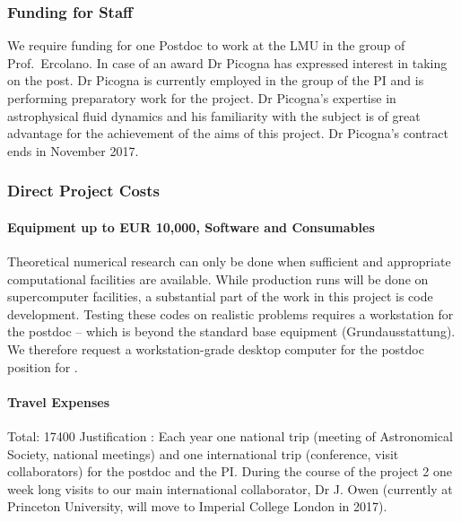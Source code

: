 \documentclass[10pt,fleqn,twoside]{article}
\begin{document}
\subsubsection{Funding for Staff}

We require funding for one Postdoc to work at the LMU in the group of
Prof.\ Ercolano. In case of an award Dr Picogna has expressed interest
in taking on the post. Dr Picogna is currently employed in the group of the
PI and is performing preparatory work for the project. Dr Picogna's
expertise in astrophysical fluid dynamics and his familiarity with the
subject is of great advantage for the achievement of the aims of this
project. Dr Picogna's contract ends in November 2017.

\subsubsection{Direct Project Costs}


\paragraph{Equipment up to EUR 10,000, Software and Consumables}

Theoretical numerical research can only be done when sufficient and
appropriate computational facilities are available. While production
runs will be done on supercomputer facilities, a substantial part of
the work in this project is code development. Testing these codes on
realistic problems requires a workstation for the postdoc -- which is
beyond the standard base equipment 
(Grundausstattung). We therefore request a workstation-grade desktop
computer for the postdoc position for .

\paragraph{Travel Expenses}

Total: 17400 \EUR{} Justification : 
Each year one national trip (meeting of Astronomical Society, national
meetings) and one international trip (conference, visit
collaborators) for the postdoc and the PI. 
During the course of the project 2 one week long visits to our main
international collaborator, Dr J. Owen (currently at Princeton
University, will move to Imperial College London in 2017).
\end{document}
